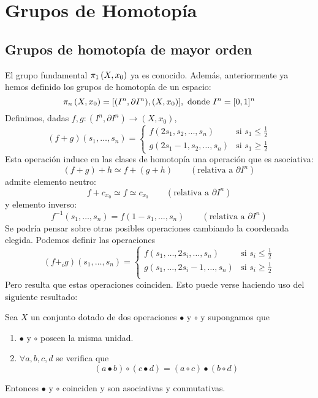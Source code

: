 \chapter{Grupos de Homotopía}
\section{Grupos de homotopía de mayor orden}
El grupo fundamental $\pi_{1}\left(X, x_0\right)$ ya es conocido. Además, anteriormente ya hemos definido los grupos de homotopía de un espacio:
\[ \pi_{n}\left(X, x_0\right) = [(I^n, \partial I^n), (X, x_0)], \text{ donde } I^n = [0,1]^n \]
Definimos, dadas $f,g : (I^n, \partial I^n) \longrightarrow (X, x_0)$,
\[
(f + g)(s_1, \ldots, s_n) = 
\begin{cases}
f(2s_1, s_2, \ldots, s_n) & \text{si } s_1 \leq \frac{1}{2} \\
g(2s_1 - 1, s_2, \ldots, s_n) & \text{si } s_1 \geq \frac{1}{2}
\end{cases}
\]
Esta operación induce en las clases de homotopía una operación que es asociativa:
\[
(f + g) + h \simeq f + (g + h) \qquad (\text{relativa a } \partial I^n)
\]
admite elemento neutro:
\[
f + c_{x_0} \simeq f \simeq c_{x_0} \qquad (\text{relativa a } \partial I^n)
\]
y elemento inverso:
\[
f^{-1} (s_1, \ldots, s_n) = f(1 - s_1, \ldots, s_n) \qquad (\text{relativa a } \partial I^n)
\]
Se podría pensar sobre otras posibles operaciones cambiando la coordenada elegida. Podemos definir las operaciones
\[
(f +_i g)(s_1, \ldots, s_n) = 
\begin{cases}
f(s_1, \ldots, 2s_i, \ldots, s_n) & \text{si } s_i \leq \frac{1}{2} \\
g(s_1, \ldots, 2s_i -1, \ldots, s_n) & \text{si } s_i \geq \frac{1}{2} \\
\end{cases}
\]
Pero resulta que estas operaciones coinciden. Esto puede verse haciendo uso del siguiente resultado:
\begin{prop}
Sea $X$ un conjunto dotado de dos operaciones $\bullet$ y $\circ$ y supongamos que 
\begin{enumerate}
\item $\bullet$ y $\circ$ poseen la misma unidad.
\item $\forall a,b,c,d$ se verifica que
\[
(a \bullet b) \circ (c \bullet d) = (a \circ c) \bullet (b \circ d) 
\]
\end{enumerate}
Entonces $\bullet$ y $\circ$ coinciden y son asociativas y conmutativas.
\end{prop}
